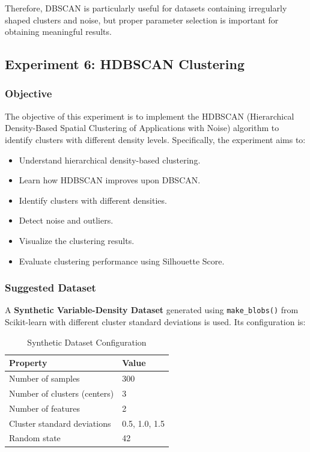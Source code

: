 \documentclass[a4paper,11pt]{article}
\begin{document}
Therefore, DBSCAN is particularly useful for datasets containing irregularly shaped clusters and noise, but proper parameter selection is important for obtaining meaningful results.

\subsection{Experiment 6: HDBSCAN Clustering}

\subsubsection{Objective}
The objective of this experiment is to implement the HDBSCAN (Hierarchical Density-Based Spatial Clustering of Applications with Noise) algorithm to identify clusters with different density levels. Specifically, the experiment aims to:
\begin{itemize}
    \item Understand hierarchical density-based clustering.
    \item Learn how HDBSCAN improves upon DBSCAN.
    \item Identify clusters with different densities.
    \item Detect noise and outliers.
    \item Visualize the clustering results.
    \item Evaluate clustering performance using Silhouette Score.
\end{itemize}

\subsubsection{Suggested Dataset}
A \textbf{Synthetic Variable-Density Dataset} generated using \texttt{make\_blobs()} from Scikit-learn with different cluster standard deviations is used. Its configuration is:

\begin{table}[H]
\centering
\caption{Synthetic Dataset Configuration}
\begin{tabular}{ll}
\toprule
\textbf{Property} & \textbf{Value} \\
\midrule
Number of samples             & 300 \\
Number of clusters (centers)  & 3 \\
Number of features            & 2 \\
Cluster standard deviations   & 0.5, 1.0, 1.5 \\
Random state                  & 42 \\
\bottomrule
\end{tabular}
\end{table}
\end{document}
